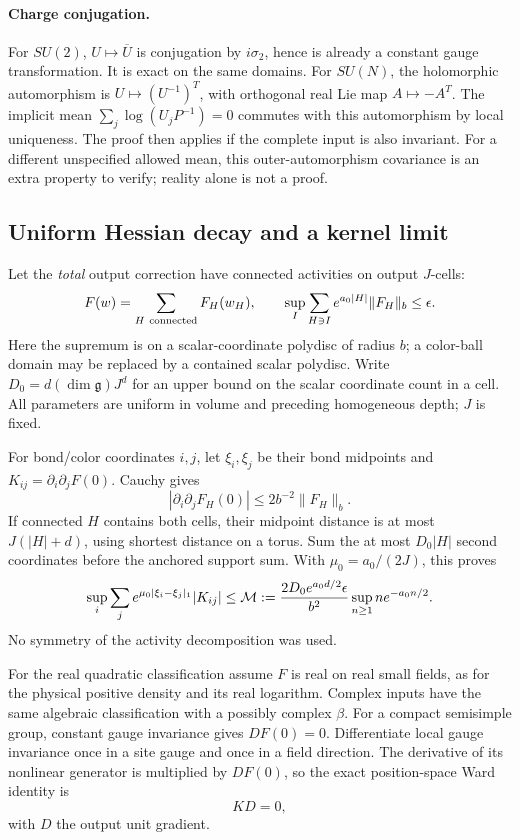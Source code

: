 \documentclass[11pt]{article}
\theoremstyle{remark}
\begin{document}
\paragraph{Charge conjugation.}
For \(SU(2)\), \(U\mapsto\overline U\) is conjugation by
\(i\sigma_2\), hence is already a constant gauge transformation.
It is exact on the same domains. For \(SU(N)\), the holomorphic
automorphism is \(U\mapsto(U^{-1})^T\), with orthogonal real Lie
map \(A\mapsto-A^T\). The implicit mean
\(\sum_j\log(U_jP^{-1})=0\) commutes with this automorphism
by local uniqueness. The proof then applies if the complete
input is also invariant. For a different unspecified allowed
mean, this outer-automorphism covariance is an extra property
to verify; reality alone is not a proof.

\subsection{Uniform Hessian decay and a kernel limit}
\label{msy-kernel-section}

Let the \emph{total} output correction have connected activities
on output \(J\)-cells:
\begin{equation}
 F(w)=\sum_{H\ {\rm connected}}F_H(w_H),\qquad
 \sup_I\sum_{H\ni I}e^{a_0|H|}\|F_H\|_b\le\epsilon.
 \label{msy-activity-norm}
\end{equation}
Here the supremum is on a scalar-coordinate polydisc of radius
\(b\); a color-ball domain may be replaced by a contained scalar
polydisc. Write \(D_0=d(\dim\mathfrak g)J^d\) for an upper bound
on the scalar coordinate count in a cell. All parameters are
uniform in volume and preceding homogeneous depth; \(J\) is fixed.

For bond/color coordinates \(i,j\), let \(\xi_i,\xi_j\) be their
bond midpoints and \(K_{ij}=\partial_i\partial_jF(0)\).
Cauchy gives
\[
 |\partial_i\partial_jF_H(0)|\le2b^{-2}\|F_H\|_b.
\]
If connected \(H\) contains both cells, their midpoint distance
is at most \(J(|H|+d)\), using shortest distance on a torus.
Sum the at most \(D_0|H|\) second coordinates before the
anchored support sum. With \(\mu_0=a_0/(2J)\), this proves
\begin{equation}
 \sup_i\sum_j e^{\mu_0|\xi_i-\xi_j|_1}|K_{ij}|
 \le {\cal M}:=
 \frac{2D_0e^{a_0d/2}\epsilon}{b^2}
                  \sup_{n\ge1}n e^{-a_0n/2}.
 \label{msy-exponential-row}
\end{equation}
No symmetry of the activity decomposition was used.

For the real quadratic classification assume \(F\) is real on real
small fields, as for the physical positive density and its real
logarithm. Complex inputs have the same algebraic classification
with a possibly complex \(\beta\).
For a compact semisimple group, constant gauge invariance
gives \(DF(0)=0\). Differentiate local gauge invariance once
in a site gauge and once in a field direction. The derivative
of its nonlinear generator is multiplied by \(DF(0)\), so
the exact position-space Ward identity is
\begin{equation}
 K D=0,
 \label{msy-Ward-realspace}
\end{equation}
with \(D\) the output unit gradient.
\end{document}
